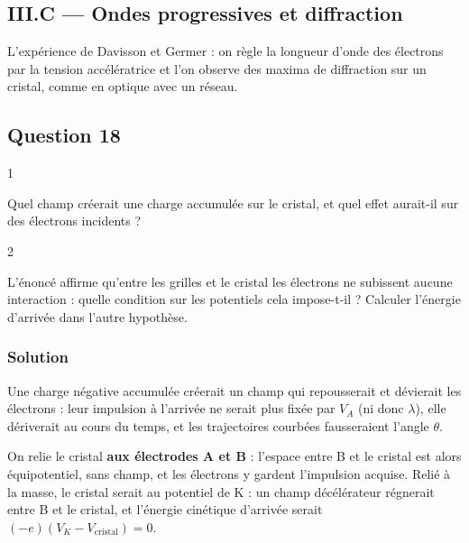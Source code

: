 \documentclass[11pt,a4paper]{article}
\begin{document}
\hypertarget{iii.c-ondes-progressives-et-diffraction}{%
\subsection{III.C --- Ondes progressives et diffraction}\label{iii.c-ondes-progressives-et-diffraction}}

L'expérience de Davisson et Germer : on règle la longueur d'onde des électrons par la tension accélératrice et l'on observe des maxima de diffraction sur un cristal, comme en optique avec un réseau.

\hypertarget{question-18}{%
\subsection{Question 18}\label{question-18}}

\begin{indication}{1}

Quel champ créerait une charge accumulée sur le cristal, et quel effet aurait-il sur des électrons incidents ?

\end{indication}

\begin{indication}{2}

L'énoncé affirme qu'entre les grilles et le cristal les électrons ne subissent aucune interaction : quelle condition sur les potentiels cela impose-t-il ? Calculer l'énergie d'arrivée dans l'autre hypothèse.

\end{indication}

\hypertarget{solution-17}{%
\subsubsection{Solution}\label{solution-17}}

Une charge négative accumulée créerait un champ qui repousserait et dévierait les électrons : leur impulsion à l'arrivée ne serait plus fixée par \(V_A\) (ni donc \(\lambda\)), elle dériverait au cours du temps, et les trajectoires courbées fausseraient l'angle \(\theta\).

On relie le cristal \textbf{aux électrodes A et B} : l'espace entre B et le cristal est alors équipotentiel, sans champ, et les électrons y gardent l'impulsion acquise. Relié à la masse, le cristal serait au potentiel de K : un champ décélérateur régnerait entre B et le cristal, et l'énergie cinétique d'arrivée serait \((-e)(V_K-V_{\text{cristal}})=0\).
\end{document}
